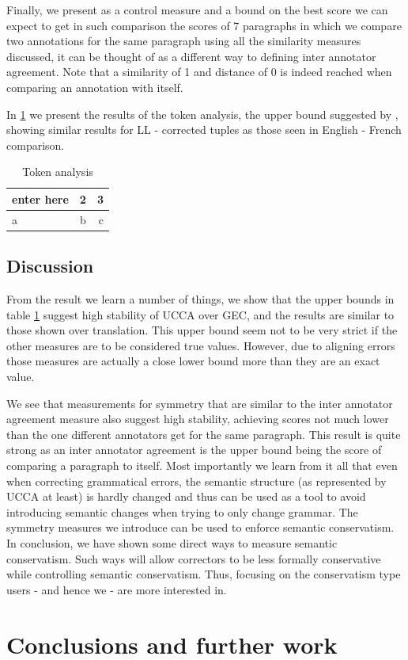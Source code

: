 \documentclass[english]{article}
\begin{document}
	Finally, we present as a control measure and a bound on the best score
	we can expect to get in such comparison the scores of 7 paragraphs
	in which we compare two annotations for the same paragraph using all
	the similarity measures discussed, it can be thought of as a different
	way to defining inter annotator agreement. Note that a similarity
	of 1 and distance of 0 is indeed reached when comparing an annotation with itself.
	
	In \ref{tab:Token_analysis} we present the results of the token analysis, the
	upper bound suggested by \cite{sulem2015conceptual}, showing similar
	results for LL - corrected tuples as those seen in English
	- French comparison.
		
		\begin{table}[h!]
			\centering
			\caption{Token analysis}
			\label{tab:Token_analysis}
			\begin{tabular}{l|c||r}
				enter here & 2 & 3\\
				\hline
				a & b & c\\
				\end{tabular}
				\end{table}
				
	\subsection{Discussion}
	
	From the result we learn a number of things, we show that the upper
	bounds in table \ref{tab:Token_analysis} suggest high stability of UCCA over GEC, and the results are similar to those shown over
	translation. This upper bound seem not to be very strict if the other
	measures are to be considered true values. 
	However, due to aligning errors those measures are actually a close lower bound more than they are an exact value.
	
	We see that measurements for symmetry that are similar to the inter
	annotator agreement measure also suggest high stability, achieving
	scores not much lower than the one different annotators get for the
	same paragraph. This result is quite strong as an inter annotator
	agreement is the upper bound being the score of comparing a paragraph to itself. 
	Most importantly we learn from it all that even when correcting grammatical errors, the semantic structure (as represented by UCCA at least) is hardly changed and thus can be used as a tool to avoid introducing semantic changes when trying to only change grammar. 
	The symmetry measures we introduce can be used to enforce semantic conservatism.
	In conclusion, we have shown some direct ways to measure
	semantic conservatism. Such ways will allow correctors to be less formally conservative while controlling semantic conservatism. Thus, focusing on the conservatism type users - and hence we - are more interested in.


\section{Conclusions and further work}



\appendix
\section{}
\end{document}
